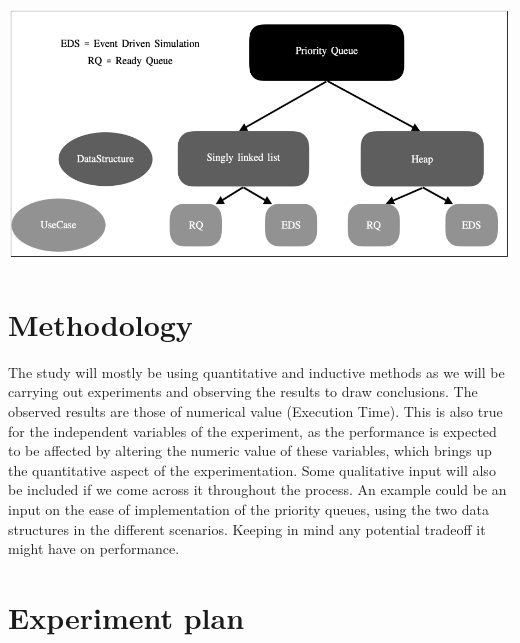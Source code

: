 \documentclass[12pt]{article}
\begin{document}
\begin{center}
\includegraphics[width=15cm]{figure-1.png}
\end{center}

\section{Methodology}

 The study will mostly be using quantitative and inductive methods as we will be carrying out experiments and observing the results to draw conclusions. The observed results are those of numerical value (Execution Time). This is also true for the independent variables of the experiment, as the performance is expected to be affected by altering the numeric value of these variables, which brings up the quantitative aspect of the experimentation. Some qualitative input will also be included if we come across it throughout the process. An example could be an input on the ease of implementation of the priority queues, using the two data structures in the different scenarios. Keeping in mind any potential tradeoff it might have on performance. 
 
\section{Experiment plan}
\end{document}
